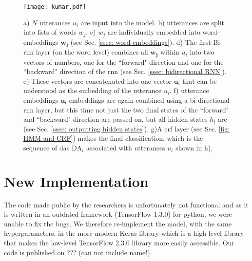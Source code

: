     \begin{figure}
        \centering
        \texttt{[image: kumar.pdf]}
        \caption{a) $N$ \glspl{utterance} $u_i$ are input into the \gls{model}. \newline 
        b) \Glspl{utterance} are split into lists of words $w_j$. \newline 
        c) $w_j$ are individually embedded into word-\glspl{embedding} $\mathbf{w_j}$ (see Sec. \ref{ssec: word embeddings}).\newline 
        d) The first Bi-\gls{rnn} layer (on the word level) combines all $\mathbf{w_j}$ within $u_i$ into two vectors of numbers, one for the ``forward" direction and one for the ``backward" direction of the \gls{rnn} (see Sec. \ref{ssec: bidirectional RNN}).\newline 
        e) These vectors are concatenated into one vector $\mathbf{u_i}$ that can be understood as the \gls{embedding} of the \gls{utterance} $u_i$.\newline 
        f) \Gls{utterance} \glspl{embedding} $\mathbf{u_i}$ \glspl{embedding} are again combined using a bi-directional \gls{rnn} layer, but this time not just the two final states of the ``forward" and ``backward" direction are passed on, but all hidden states $h_i$ are (see Sec. \ref{ssec: outputting hidden states}).\newline 
        g)A \gls{crf} layer (see Sec. \ref{fig: HMM and CRF}) makes the final classification, which is the sequence of \glspl{da} $\text{DA}_i$ associated with \glspl{utterance} $u_i$ shown in h).}
        \label{fig:kumar_model}
    \end{figure}

    \section{New Implementation}
        The code made public by the researchers is unfortunately not functional and as it is written in an outdated framework (TensorFlow 1.3.0\cite{tensorflow2015-whitepaper}) for python, we were unable to fix the bugs. We therefore re-implement the \gls{model}, with the same hyperparameters, in the more modern Keras library\cite{chollet2015keras} which is a high-level library that makes the low-level TensorFlow 2.3.0 library more easily accessible. Our code is published on ??? (can not include name!).

